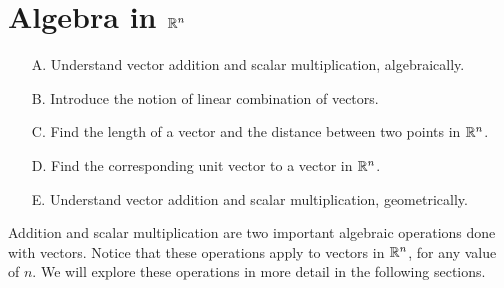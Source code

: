 \section{Algebra in \texorpdfstring{$\mathbb{R}^{n}$}{Rn}}

\begin{outcome}
\begin{enumerate}
\item[A.] Understand vector addition and scalar multiplication, algebraically. 
\item[B.] Introduce the notion of linear combination of vectors. 
\item[C.] Find the length of a vector and the distance between two points in $\mathbb{R}^n$.
\item[D.] Find the corresponding unit vector to a vector in $\mathbb{R}^n$.
\item[E.] Understand vector addition and scalar multiplication, geometrically.
\end{enumerate}
\end{outcome}

Addition and scalar multiplication are two important algebraic operations done with vectors. Notice that these operations
apply to vectors in $\mathbb{R}^{n}$, for any 
value of $n$. We will explore these operations in more detail in the following sections.
